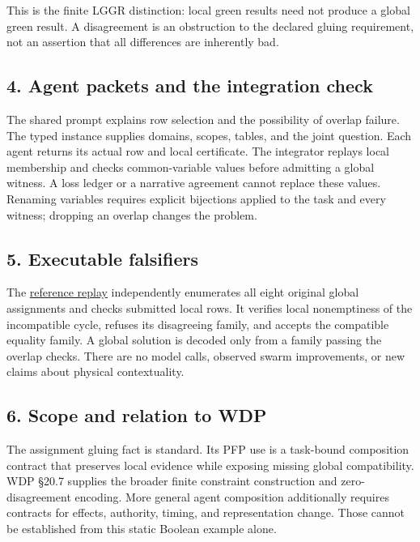 \documentclass[
  11pt,
]{article}
\begin{document}
This is the finite LGGR distinction: local green results need not
produce a global green result. A disagreement is an obstruction to the
declared gluing requirement, not an assertion that all differences are
inherently bad.

\subsection{4. Agent packets and the integration
check}\label{agent-packets-and-the-integration-check}

The shared prompt explains row selection and the possibility of overlap
failure. The typed instance supplies domains, scopes, tables, and the
joint question. Each agent returns its actual row and local certificate.
The integrator replays local membership and checks common-variable
values before admitting a global witness. A loss ledger or a narrative
agreement cannot replace these values. Renaming variables requires
explicit bijections applied to the task and every witness; dropping an
overlap changes the problem.

\subsection{5. Executable falsifiers}\label{executable-falsifiers}

The
\href{https://github.com/dbccpage/the_symbol_game/blob/main/atlas/coda_atlas/F004_papers/015_pfp/025_pfp_local_to_global_agent_composition/code/replay.py}{reference
replay} independently enumerates all eight original global assignments
and checks submitted local rows. It verifies local nonemptiness of the
incompatible cycle, refuses its disagreeing family, and accepts the
compatible equality family. A global solution is decoded only from a
family passing the overlap checks. There are no model calls, observed
swarm improvements, or new claims about physical contextuality.

\subsection{6. Scope and relation to
WDP}\label{scope-and-relation-to-wdp}

The assignment gluing fact is standard. Its PFP use is a task-bound
composition contract that preserves local evidence while exposing
missing global compatibility. WDP §20.7 supplies the broader finite
constraint construction and zero-disagreement encoding. More general
agent composition additionally requires contracts for effects,
authority, timing, and representation change. Those cannot be
established from this static Boolean example alone.
\end{document}
